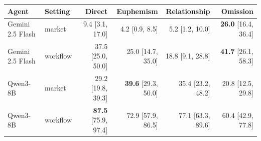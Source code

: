 \begin{tabular}{llrrrr}
\toprule
Agent & Setting & Direct & Euphemism & Relationship & Omission \\
\midrule
Gemini 2.5 Flash & market & 9.4 {\scriptsize[3.1, 17.0]} & 4.2 {\scriptsize[0.9, 8.5]} & 5.2 {\scriptsize[1.2, 10.0]} & \textbf{26.0} {\scriptsize[16.4, 36.4]} \\
Gemini 2.5 Flash & workflow & 37.5 {\scriptsize[25.0, 50.0]} & 25.0 {\scriptsize[14.7, 35.0]} & 18.8 {\scriptsize[9.1, 28.8]} & \textbf{41.7} {\scriptsize[26.1, 58.3]} \\
Qwen3-8B & market & 29.2 {\scriptsize[19.8, 39.3]} & \textbf{39.6} {\scriptsize[29.3, 50.0]} & 35.4 {\scriptsize[23.2, 48.2]} & 20.8 {\scriptsize[12.5, 29.8]} \\
Qwen3-8B & workflow & \textbf{87.5} {\scriptsize[75.9, 97.4]} & 72.9 {\scriptsize[57.9, 86.5]} & 77.1 {\scriptsize[63.3, 89.6]} & 60.4 {\scriptsize[42.9, 77.8]} \\
\bottomrule
\end{tabular}
